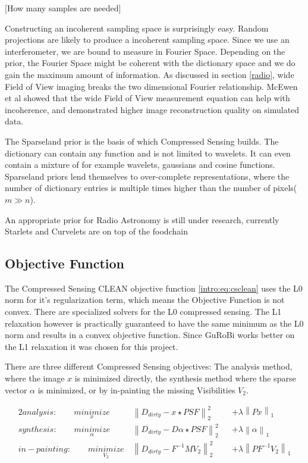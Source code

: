 [How many samples are needed]

Constructing an incoherent sampling space is surprisingly easy. Random projections are likely to produce a incoherent sampling space. Since we use an interferometer, we are bound to measure in Fourier Space. Depending on the prior, the Fourier Space might be coherent with the dictionary space and we do gain the maximum amount of information. As discussed in section \ref{radio}, wide Field of View imaging breaks the two dimensional Fourier relationship. McEwen et al\cite{mcewen2011compressed} showed that the wide Field of View measurement equation can help with incoherence, and demonstrated higher image reconstruction quality on simulated data.

The Sparseland prior is the basis of which Compressed Sensing builds. The dictionary can contain any function and is not limited to wavelets. It can even contain a mixture of for example wavelets, gaussians and cosine functions. Sparseland priors lend themselves to over-complete representations, where the number of dictionary entries is multiple times higher than the number of pixels($m \gg n$). 

An appropriate prior for Radio Astronomy is still under research, currently Starlets\cite{starck2015starlet} and Curvelets\cite{starck2003astronomical} are on top of the foodchain


\subsection{Objective Function}
The Compressed Sensing CLEAN objective function \eqref{intro:eq:csclean} uses the L0 norm for it's regularization term, which means the Objective Function is not convex. There are specialized solvers for the L0 compressed sensing. The L1 relaxation however is practically guaranteed to have the same minimum as the L0 norm and results in a convex objective function. Since GuRoBi works better on the L1 relaxation it was chosen for this project.

There are three different Compressed Sensing objectives: The analysis method, where the image $x$ is minimized directly, the synthesis method where the sparse vector $\alpha$ is minimized, or by in-painting the missing Visibilities $V_2$.

\begin{alignat*}{2}
	analysis:\qquad \underset{x}{minimize} \:& \left \| D_{dirty} - x \star PSF \right \|_2^2 &&+  \lambda \left \| Px \right \|_1 \\
	synthesis:\qquad \underset{\alpha}{minimize} \:& \left \| D_{dirty} - D \alpha \star PSF \right \|_2^2 &&+ \lambda \left \| \alpha \right \|_1 \\
	in-painting:\qquad \underset{V_2}{minimize} \:& \left \|  D_{dirty} - F^{-1} M V_2 \right \|_2^2 &&+ \lambda \left \| PF^{-1}V_2\right \|_1
\end{alignat*}

